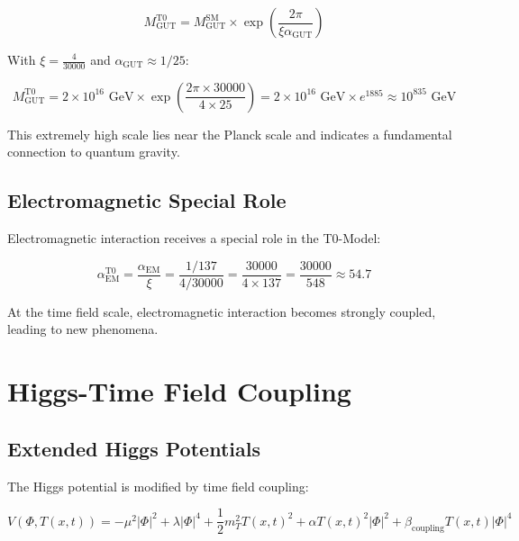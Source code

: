 \documentclass[12pt,a4paper]{report}
\newcommand{\Tfield}{T(x,t)}  %
\newcommand{\xipar}{\xi}      %
\begin{document}
	\begin{equation}\label{eq:unification_scale_t0}
		M_{\text{GUT}}^{\text{T0}} = M_{\text{GUT}}^{\text{SM}} \times \exp\left(\frac{2\pi}{\xipar \alpha_{\text{GUT}}}\right)
	\end{equation}
	
	With $\xipar = \frac{4}{30000}$ and $\alpha_{\text{GUT}} \approx 1/25$:
	
	\begin{equation}
		M_{\text{GUT}}^{\text{T0}} = 2 \times 10^{16} \text{ GeV} \times \exp\left(\frac{2\pi \times 30000}{4 \times 25}\right) = 2 \times 10^{16} \text{ GeV} \times e^{1885} \approx 10^{835} \text{ GeV}
	\end{equation}
	
	This extremely high scale lies near the Planck scale and indicates a fundamental connection to quantum gravity.
	
	\subsection{Electromagnetic Special Role}\label{subsec:em_special_role}
	
	Electromagnetic interaction receives a special role in the T0-Model:
	
	\begin{equation}
		\alpha_{\text{EM}}^{\text{T0}} = \frac{\alpha_{\text{EM}}}{\xipar} = \frac{1/137}{4/30000} = \frac{30000}{4 \times 137} = \frac{30000}{548} \approx 54.7
	\end{equation}
	
	At the time field scale, electromagnetic interaction becomes strongly coupled, leading to new phenomena.
	
	\section{Higgs-Time Field Coupling}\label{sec:higgs_timefield_coupling}
	
	\subsection{Extended Higgs Potentials}\label{subsec:extended_higgs_potentials}
	
	The Higgs potential is modified by time field coupling:
	
	\begin{equation}\label{eq:higgs_potential_t0}
		V(\Phi, \Tfield) = -\mu^2 |\Phi|^2 + \lambda |\Phi|^4 + \frac{1}{2} m_T^2 \Tfield^2 + \alpha \Tfield^2 |\Phi|^2 + \beta_{\text{coupling}} \Tfield |\Phi|^4
	\end{equation}
	
\end{document}
